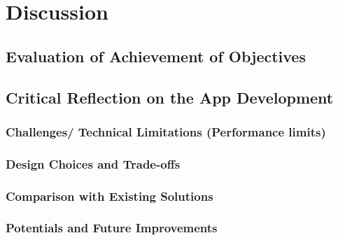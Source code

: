 
\chapter{Discussion}\label{chapter:discussion}

\section{Evaluation of Achievement of Objectives}

\section{Critical Reflection on the App Development}
\subsection{Challenges/ Technical Limitations (Performance limits)}
\subsection{Design Choices and Trade-offs}
\subsection{Comparison with Existing Solutions}
\subsection{Potentials and Future Improvements}